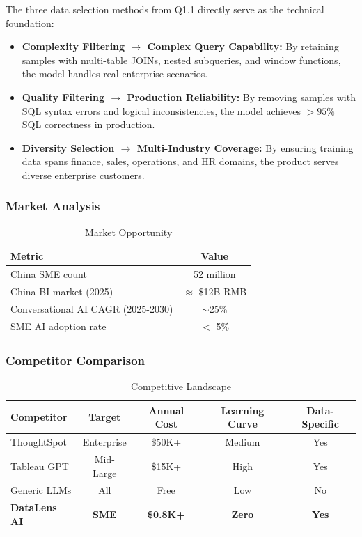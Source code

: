 \documentclass[12pt,a4paper]{article}
\begin{document}
The three data selection methods from Q1.1 directly serve as the technical foundation:

\begin{itemize}[leftmargin=*]
    \item \textbf{Complexity Filtering $\rightarrow$ Complex Query Capability:} By retaining samples with multi-table JOINs, nested subqueries, and window functions, the model handles real enterprise scenarios.
    \item \textbf{Quality Filtering $\rightarrow$ Production Reliability:} By removing samples with SQL syntax errors and logical inconsistencies, the model achieves $>95\%$ SQL correctness in production.
    \item \textbf{Diversity Selection $\rightarrow$ Multi-Industry Coverage:} By ensuring training data spans finance, sales, operations, and HR domains, the product serves diverse enterprise customers.
\end{itemize}

\subsubsection{Market Analysis}

\begin{table}[H]
\centering
\caption{Market Opportunity}
\begin{tabular}{lc}
\toprule
\textbf{Metric} & \textbf{Value} \\
\midrule
China SME count & 52 million \\
China BI market (2025) & $\approx$ \$12B RMB \\
Conversational AI CAGR (2025-2030) & $\sim$25\% \\
SME AI adoption rate & $<$ 5\% \\
\bottomrule
\end{tabular}
\end{table}

\subsubsection{Competitor Comparison}

\begin{table}[H]
\centering
\caption{Competitive Landscape}
\begin{tabular}{lcccc}
\toprule
\textbf{Competitor} & \textbf{Target} & \textbf{Annual Cost} & \textbf{Learning Curve} & \textbf{Data-Specific} \\
\midrule
ThoughtSpot & Enterprise & \$50K+ & Medium & Yes \\
Tableau GPT & Mid-Large & \$15K+ & High & Yes \\
Generic LLMs & All & Free & Low & No \\
\textbf{DataLens AI} & \textbf{SME} & \textbf{\$0.8K+} & \textbf{Zero} & \textbf{Yes} \\
\bottomrule
\end{tabular}
\end{table}
\end{document}
